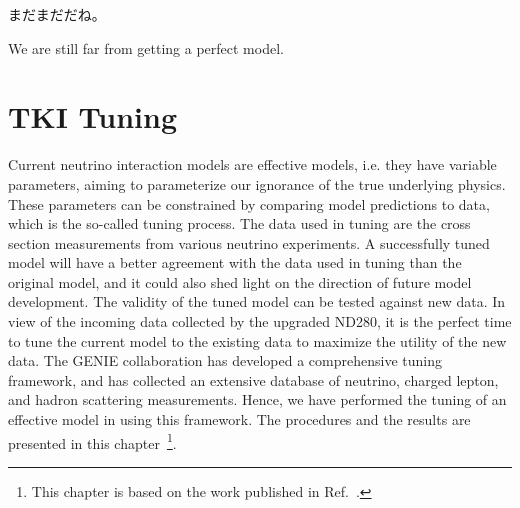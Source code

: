 \begin{savequote}[8cm]
\begin{CJK*}{UTF8}{min}
まだまだだね。
\end{CJK*}

We are still far from getting a perfect model.
\end{savequote}

\chapter{\label{ch:tuning}TKI Tuning}

\minitoc

Current neutrino interaction models are effective models, i.e. they have variable parameters, aiming to parameterize our ignorance of the true underlying physics.
These parameters can be constrained by comparing model predictions to data, which is the so-called tuning process.
The data used in tuning are the cross section measurements from various neutrino experiments.
A successfully tuned model will have a better agreement with the data used in tuning than the original model, and it could also shed light on the direction of future model development.
The validity of the tuned model can be tested against new data.
In view of the incoming data collected by the upgraded ND280, it is the perfect time to tune the current model to the existing data to maximize the utility of the new data.
The GENIE collaboration has developed a comprehensive tuning framework, and has collected an extensive database of neutrino, charged lepton, and hadron scattering measurements. 
Hence, we have performed the tuning of an effective model in \genie using this framework.
The procedures and the results are presented in this chapter~\footnote{This chapter is based on the work published in Ref.~\cite{GENIE:2024ufm}.}.

